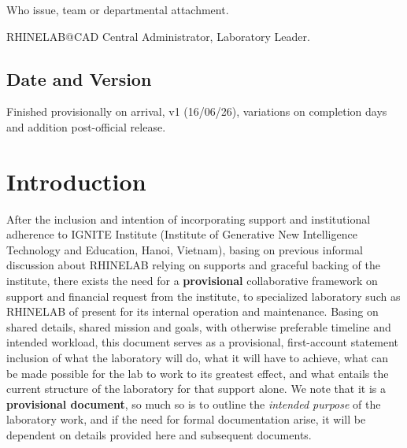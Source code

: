 \documentclass[10pt,a4paper]{article}
\begin{document}
{\footnotesize
Who issue, team or departmental attachment. 
}

\textsf{RHINELAB@CAD} Central Administrator, Laboratory Leader. 

\subsection{Date and Version}

Finished provisionally on arrival, v1 (16/06/26), variations on completion days and addition post-official release. 




\section{Introduction}

After the inclusion and intention of incorporating support and institutional adherence to IGNITE Institute (Institute of Generative New Intelligence Technology and Education, Hanoi, Vietnam), basing on previous informal discussion about RHINELAB relying on supports and graceful backing of the institute, there exists the need for a \textbf{provisional} collaborative framework on support and financial request from the institute, to specialized laboratory such as RHINELAB of present for its internal operation and maintenance. Basing on shared details, shared mission and goals, with otherwise preferable timeline and intended workload, this document serves as a provisional, first-account statement inclusion of what the laboratory will do, what it will have to achieve, what can be made possible for the lab to work to its greatest effect, and what entails the current structure of the laboratory for that support alone. We note that it is a \textbf{provisional document}, so much so is to outline the \textit{intended purpose} of the laboratory work, and if the need for formal documentation arise, it will be dependent on details provided here and subsequent documents. 
\end{document}
